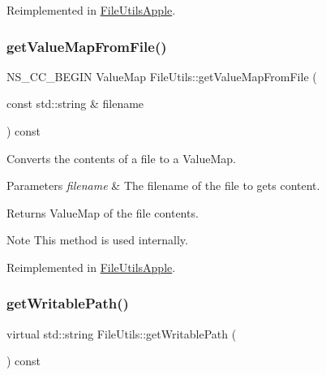 Reimplemented in \hyperlink{classFileUtilsApple_a29093cea02fd4a89629ffb087e0f480b}{File\+Utils\+Apple}.

\mbox{\label{classFileUtils_a7a5c18baa7c28962d642c101513c7c1b}} 
\subsubsection{\texorpdfstring{get\+Value\+Map\+From\+File()}{getValueMapFromFile()}\hspace{0.1cm}{\footnotesize\ttfamily [2/2]}}
{\footnotesize\ttfamily N\+S\+\_\+\+C\+C\+\_\+\+B\+E\+G\+IN Value\+Map File\+Utils\+::get\+Value\+Map\+From\+File (\begin{DoxyParamCaption}\item[{const std\+::string \&}]{filename }\end{DoxyParamCaption}) const\hspace{0.3cm}{\ttfamily [virtual]}}

Converts the contents of a file to a Value\+Map. 
\begin{DoxyParams}{Parameters}
{\em filename} & The filename of the file to gets content. \\
\hline
\end{DoxyParams}
\begin{DoxyReturn}{Returns}
Value\+Map of the file contents. 
\end{DoxyReturn}
\begin{DoxyNote}{Note}
This method is used internally. 
\end{DoxyNote}


Reimplemented in \hyperlink{classFileUtilsApple_a400898c9e5777199a45372e98f1c6e0c}{File\+Utils\+Apple}.

\mbox{\label{classFileUtils_aab14c8d4e292f7a1e9b2b2908d02a0ed}} 
\subsubsection{\texorpdfstring{get\+Writable\+Path()}{getWritablePath()}\hspace{0.1cm}{\footnotesize\ttfamily [1/2]}}
{\footnotesize\ttfamily virtual std\+::string File\+Utils\+::get\+Writable\+Path (\begin{DoxyParamCaption}{ }\end{DoxyParamCaption}) const\hspace{0.3cm}{\ttfamily [pure virtual]}}

